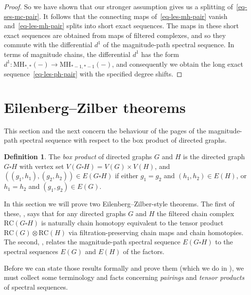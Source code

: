 \documentclass[a4paper, 11 pt, oneside, reqno]{amsart}
\numberwithin{lemma}{section}
\theoremstyle{definition}
\newtheorem{definition}[lemma]{Definition}
\newcommand{\demph}[1]{\emph{#1}}
\newcommand{\RC}{\mathrm{RC}}
\newcommand{\MH}{\mathrm{MH}}
\newcommand{\MPSS}{E}
\begin{document}
\begin{proof}
    So we have shown that our stronger assumption gives us a
    splitting of~\eqref{eq-ses-mc-pair}.
    It follows that the connecting maps of~\eqref{eq-les-mh-pair}
    vanish and~\eqref{eq-les-mh-pair} splits into short exact 
    sequences.
    The maps in these short exact sequences are obtained from maps
    of filtered complexes, and so they commute with the differential
    $d^1$ of the magnitude-path spectral sequence.
    In terms of magnitude chains, 
    the differential $d^1$ has the form
    $d^1\colon\MH_{\ast,\ast}(-)\to\MH_{\ast-1,\ast-1}(-)$,
    and consequently  we obtain the long exact 
    sequence~\eqref{eq-les-ph-pair} with the specified degree shifts.
\end{proof}


\section{Eilenberg--Zilber theorems}\label{sec:E-Z}

This section and the next concern the behaviour of the pages of the magnitude-path spectral sequence with respect to the box product of directed graphs.

\begin{definition}
\label{def:box}
The \demph{box product} of directed graphs \(G\) and \(H\) is the directed graph \(G \square H\) with vertex set \(V(G \square H) = V(G) \times V(H)\), and \(((g_1,h_1),(g_2,h_2)) \in E(G \square H)\) if either \(g_1 = g_2\) and \((h_1,h_2) \in E(H)\), or \(h_1 = h_2\) and \((g_1,g_2) \in E(G)\).
\end{definition}

In this section we will prove two Eilenberg--Zilber-style theorems. The first of these, , says that for any directed graphs \(G\) and \(H\) the filtered chain complex \(\RC(G \square H)\) is naturally chain homotopy equivalent to the tensor product \(\RC(G) \otimes \RC(H)\) via filtration-preserving chain maps and chain homotopies. The second, , relates the magnitude-path spectral sequence $E(G\square H)$ to the spectral sequences \(\MPSS(G)\) and \(\MPSS(H)\) of the factors. 

Before we can state those results formally and prove them (which we do in ), we must collect some terminology and facts concerning \emph{pairings} and \emph{tensor products} of spectral sequences.
\end{document}
